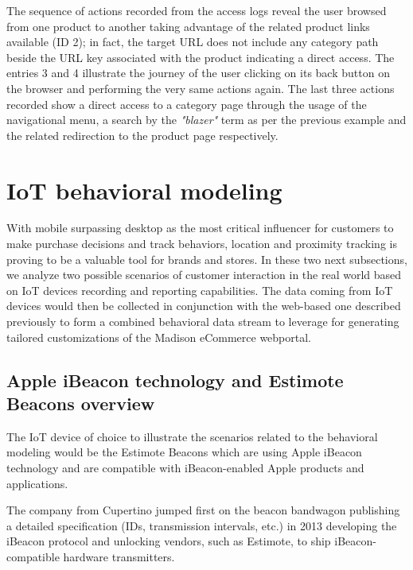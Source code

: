 The sequence of actions recorded from the access logs reveal the user browsed from one product to another taking advantage of the related product links available (ID 2); in fact, the target URL does not include any category path beside the URL key associated with the product indicating a direct access. The entries 3 and 4 illustrate the journey of the user clicking on its back button on the browser and performing the very same actions again. The last three actions recorded show a direct access to a category page through the usage of the navigational menu, a search by the \textit{"blazer"} term as per the previous example and the related redirection to the product page respectively.

\newpage
\section{IoT behavioral modeling}

With mobile surpassing desktop as the most critical influencer for customers to make purchase decisions and track behaviors, location and proximity tracking is proving to be a valuable tool for brands and stores.  In these two next subsections, we analyze two possible scenarios of customer interaction in the real world based on IoT devices recording and reporting capabilities. The data coming from IoT devices would then be collected in conjunction with the web-based one described previously to form a combined behavioral data stream to leverage for generating tailored customizations of the Madison eCommerce webportal.

\subsection{Apple iBeacon technology and Estimote Beacons overview}

The IoT device of choice to illustrate the scenarios related to the behavioral modeling would be the Estimote Beacons which are using Apple iBeacon technology and are compatible with iBeacon-enabled Apple products and applications.

The company from Cupertino jumped first on the beacon bandwagon publishing a detailed specification (IDs, transmission intervals, etc.) in 2013 developing the iBeacon protocol and unlocking vendors, such as Estimote, to ship iBeacon-compatible hardware transmitters.

